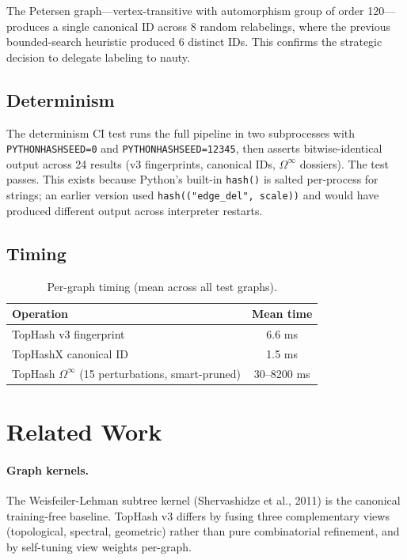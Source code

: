 \documentclass[11pt]{article}
\begin{document}
The Petersen graph---vertex-transitive with automorphism group of order 120---produces a single canonical ID across 8 random relabelings, where the previous bounded-search heuristic produced 6 distinct IDs. This confirms the strategic decision to delegate labeling to nauty.

\subsection{Determinism}

The determinism CI test runs the full pipeline in two subprocesses with \texttt{PYTHONHASHSEED=0} and \texttt{PYTHONHASHSEED=12345}, then asserts bitwise-identical output across 24 results (v3 fingerprints, canonical IDs, $\Omega^\infty$ dossiers). The test passes. This exists because Python's built-in \texttt{hash()} is salted per-process for strings; an earlier version used \texttt{hash(("edge\_del", scale))} and would have produced different output across interpreter restarts.

\subsection{Timing}

\begin{table}[h]
\centering
\caption{Per-graph timing (mean across all test graphs).}
\label{tab:timing}
\begin{tabular}{lc}
\toprule
Operation & Mean time \\
\midrule
TopHash v3 fingerprint & 6.6 ms \\
TopHashX canonical ID & 1.5 ms \\
TopHash $\Omega^\infty$ (15 perturbations, smart-pruned) & 30--8200 ms \\
\bottomrule
\end{tabular}
\end{table}

\section{Related Work}

\paragraph{Graph kernels.} The Weisfeiler-Lehman subtree kernel (Shervashidze et al., 2011) is the canonical training-free baseline. TopHash v3 differs by fusing three complementary views (topological, spectral, geometric) rather than pure combinatorial refinement, and by self-tuning view weights per-graph.
\end{document}
